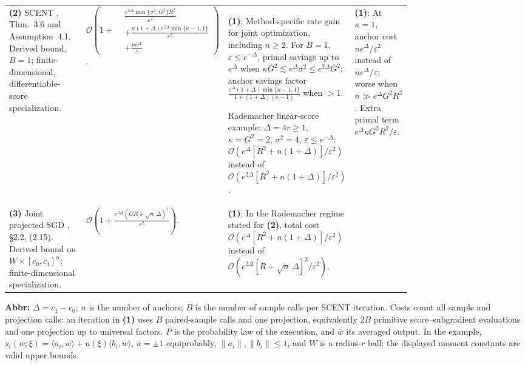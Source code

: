 \begin{table}[tp]
\begin{threeparttable}
\begin{tabularx}{\linewidth}{@{}>{\raggedright\arraybackslash}p{0.20\linewidth}>{\raggedright\arraybackslash}p{0.32\linewidth}>{\raggedright\arraybackslash}p{0.25\linewidth}>{\raggedright\arraybackslash}X@{}}
& & \\
\midrule[1.2pt]
\textbf{(2)} SCENT \citep{cermWei2026v2}, Thm.~3.6 and Assumption~4.1. Derived bound, $B=1$; finite-dimensional, differentiable-score specialization.
& $\mathcal{O}\!\left(1+\begin{aligned}&\frac{e^{2\Delta}\min\{\sigma^2,G^2\}R^2}{\varepsilon^2}\\&+\frac{n(1+\Delta)e^{2\Delta}\min\{\kappa-1,1\}}{\varepsilon^2}\\&+\frac{ne^\Delta}{\varepsilon}\end{aligned}\right)$.
& \textbf{(1)}: Method-specific rate gain for joint optimization, including $n\ge2$. For $B=1$, $\varepsilon\le e^{-\Delta}$, primal savings up to $e^\Delta$ when $\kappa G^2\lesssim e^\Delta\sigma^2\le e^{2\Delta}G^2$; anchor savings factor $\frac{e^\Delta(1+\Delta)\min\{\kappa-1,1\}}{1+(1+\Delta)(\kappa-1)}$ when $>1$.
\par Rademacher linear-score example: $\Delta=4r\ge1$, $\kappa=G^2=2$, $\sigma^2=4$, $\varepsilon\le e^{-\Delta}$: $\mathcal{O}(e^\Delta[R^2+n(1+\Delta)]/\varepsilon^2)$ instead of $\mathcal{O}(e^{2\Delta}[R^2+n(1+\Delta)]/\varepsilon^2)$.
& \textbf{(1)}: At $\kappa=1$, anchor cost $ne^\Delta/\varepsilon^2$ instead of $ne^\Delta/\varepsilon$; worse when $n\gg e^\Delta G^2R^2$. Extra primal term $e^\Delta\kappa G^2R^2/\varepsilon$. \\
\midrule
\textbf{(3)} Joint projected SGD \citep{cermNemirovski2009}, \S2.2, (2.15). Derived bound on $W\times[c_0,c_1]^n$; finite-dimensional specialization.
& $\mathcal{O}\!\left(1+\frac{e^{2\Delta}(GR+\sqrt n\,\Delta)^2}{\varepsilon^2}\right)$.
& \textbf{(1)}: In the Rademacher regime stated for \textbf{(2)}, total cost $\mathcal{O}(e^\Delta[R^2+n(1+\Delta)]/\varepsilon^2)$ instead of $\mathcal{O}(e^{2\Delta}[R+\sqrt n\,\Delta]^2/\varepsilon^2)$.
& \\
\bottomrule
\end{tabularx}
\begin{tablenotes}[flushleft]\footnotesize
\item[] \textbf{Abbr:} $\Delta=c_1-c_0$; $n$ is the number of anchors; $B$ is the number of sample calls per SCENT iteration. Costs count all sample and projection calls: an iteration in \textbf{(1)} uses $B$ paired-sample calls and one projection, equivalently $2B$ primitive score--subgradient evaluations and one projection up to universal factors. $P$ is the probability law of the execution, and $\bar w$ its averaged output. In the example, $s_i(w;\xi)=\langle a_i,w\rangle+u(\xi)\langle b_i,w\rangle$, $u=\pm1$ equiprobably, $\|a_i\|,\|b_i\|\le1$, and $W$ is a radius-$r$ ball; the displayed moment constants are valid upper bounds.
\end{tablenotes}
\end{threeparttable}
\end{table}
